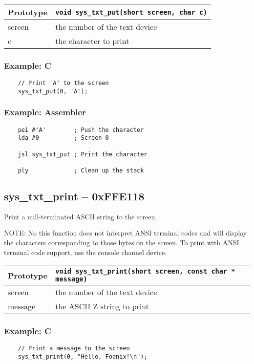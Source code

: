\bigskip

\begin{tabular}{|l||l|} \hline
Prototype & \lstinline!void sys_txt_put(short screen, char c)! \\ \hline
screen & the number of the text device \\ \hline
c & the character to print \\ \hline
\end{tabular}

\subsubsection*{Example: C}
\begin{lstlisting}
    // Print 'A' to the screen
    sys_txt_put(0, 'A');
\end{lstlisting}

\subsubsection*{Example: Assembler}
\begin{verbatim}
    pei #'A'        ; Push the character
    lda #0          ; Screen 0
    
    jsl sys_txt_put ; Print the character

    ply             ; Clean up the stack
\end{verbatim}

\subsection*{sys\_txt\_print -- 0xFFE118}
Print a null-terminated ASCII string to the screen.

NOTE: No this function does not interpret ANSI terminal codes and will display
the characters corresponding to those bytes on the screen. To print with ANSI
terminal code support, use the console channel device.

\bigskip

\begin{tabular}{|l||l|} \hline
Prototype & \lstinline!void sys_txt_print(short screen, const char * message)! \\ \hline
screen & the number of the text device \\ \hline
message & the ASCII Z string to print \\ \hline
\end{tabular}

\subsubsection*{Example: C}
\begin{lstlisting}
    // Print a message to the screen
    sys_txt_print(0, "Hello, Foenix!\n");
\end{lstlisting}

